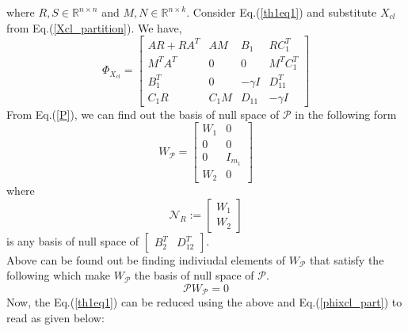 \documentclass[a4paper,12pt]{article}
\begin{document}
	where $R,S \in \mathbb{R}^{n \times n}$ and $M, N \in \mathbb{R}^{n \times k}$. 
Consider Eq.(\ref{th1eq1}) and substitute $X_{cl}$ from Eq.(\ref{Xcl_partition}). We have,
	\begin{equation}
	\Phi_{X_{cl}} = \begin{bmatrix}
	AR+RA^{T} & AM & B_{1} & RC_{1}^{T} \\
	M^{T}A^{T} & 0 & 0 & M^{T}C_{1}^{T} \\
	B_{1}^{T} & 0 & -\gamma I & D_{11}^{T} \\
	C_{1}R & C_{1}M & D_{11} & -\gamma I
	\end{bmatrix}
	\label{phixcl_part}
	\end{equation}
	From Eq.(\ref{P}), we can find out the basis of null space of $\mathscr{P}$ in the following form
	\[
	W_{\mathscr{P}} = \begin{bmatrix}
	W_{1} & 0\\
	0 & 0 \\
	0 & I_{m_{1}} \\
	W_{2} & 0
	\end{bmatrix}
	\]
	where 
	\[
	\mathscr{N}_{R} := \begin{bmatrix}
	W_{1} \\ W_{2}
	\end{bmatrix}
	\] is any basis of null space of $\begin{bmatrix}
	B_{2}^{T} & D_{12}^{T}
	\end{bmatrix}$. \\
	Above can be found out be finding indiviudal elements of $W_{\mathscr{P}}$ that satisfy the following which make $W_{\mathscr{P}}$  the basis of null space of $\mathscr{P}$.
	\begin{equation}
	\mathscr{P}W_{\mathscr{P}} = 0
	\end{equation}
	Now, the Eq.(\ref{th1eq1}) can be reduced using the above and Eq.(\ref{phixcl_part}) to read as given below:
\end{document}
